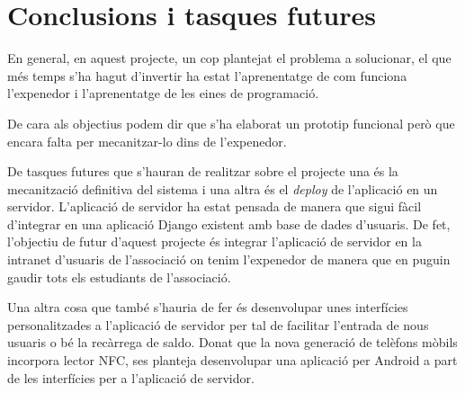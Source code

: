 \chapter{Conclusions i tasques futures}

En general, en aquest projecte, un cop plantejat el problema a solucionar, el que més temps s'ha hagut d'invertir ha estat l'aprenentatge de com funciona l'expenedor i l'aprenentatge de les eines de programació.

De cara als objectius podem dir que s'ha elaborat un prototip funcional però que encara falta per mecanitzar-lo dins de l'expenedor.

De tasques futures que s'hauran de realitzar sobre el projecte una és la mecanització definitiva del sistema i una altra és el \textit{deploy} de l'aplicació en un servidor. L'aplicació de servidor ha estat pensada de manera que sigui fàcil d'integrar en una aplicació Django existent amb base de dades d'usuaris. De fet, l'objectiu de futur d'aquest projecte és integrar l'aplicació de servidor en la intranet d'usuaris de l'associació on tenim l'expenedor de manera que en puguin gaudir tots els estudiants de l'associació.

Una altra cosa que també s'hauria de fer és desenvolupar unes interfícies personalitzades a l'aplicació de servidor per tal de facilitar l'entrada de nous usuaris o bé la recàrrega de saldo. Donat que la nova generació de telèfons mòbils incorpora lector NFC, ses planteja desenvolupar una aplicació per Android a part de les interfícies per a l'aplicació de servidor.